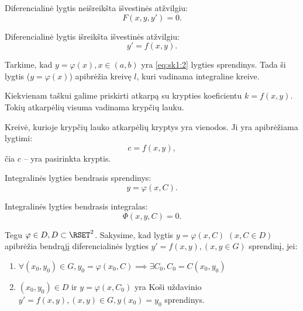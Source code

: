 
Diferencialinė lygtis neišreikšta išvestinės atžvilgiu:
\begin{equation}
  F (x, y, y') = 0.
  \label{eq:sk1:1}
\end{equation}

Diferencialinė lygtis išreikšta išvestinės atžvilgiu:
\begin{equation}
  y' = f(x, y).
  \label{eq:sk1:2}
\end{equation}

\begin{defn}
  Tarkime, kad $y = \varphi(x), x \in (a, b)$ yra \ref{eq:sk1:2} lygties
  sprendinys. Tada ši lygtis ($y = \varphi(x)$) apibrėžia kreivę
  $l$, kuri vadinama integraline kreive.
\end{defn}

\begin{defn}
  Kiekvienam taškui galime priskirti atkarpą su krypties koeficientu
  $k = f(x, y)$. Tokių atkarpėlių visuma vadinama krypčių lauku.
\end{defn}

\begin{defn}[Izoklina]
  Kreivė, kurioje krypčių lauko atkarpėlių kryptys yra vienodos.
  Ji yra apibrėžiama lygtimi:
  \begin{equation*}
    c = f(x, y),
  \end{equation*}
  čia $c$ – yra pasirinkta kryptis.
\end{defn}

Integralinės lygties bendrasis sprendinys:
\begin{equation}
  y = \varphi(x, C).
  \label{eq:sk1:3}
\end{equation}

Integralinės lygties bendrasis integralas:
\begin{equation}
  \Phi(x, y, C) = 0.
  \label{eq:sk1:4}
\end{equation}

\begin{defn}
  Tegu $\varphi \in D, D \subset \RSET^{2}$. Sakysime, kad lygtis
  $y = \varphi(x, C)$ $(x, C \in D)$ apibrėžia bendrąjį diferencialinės
  lygties $y' = f(x, y), (x, y \in G)$ sprendinį, jei:
  \begin{enumerate}
    \item $\forall (x_{0}, y_{0}) \in G, y_{0} = \varphi(x_{0}, C) \implies%
      \exists C_{0}, C_{0} = C(x_{0}, y_{0})$
    \item $(x_{0}, y_{0}) \in D$ ir $y = \varphi(x, C_{0})$ yra Koši
      uždavinio $y' = f(x, y), (x, y) \in G, y(x_{0}) = y_{0}$
      sprendinys.
  \end{enumerate}
\end{defn}

